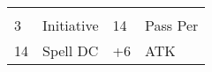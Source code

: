 \documentclass{article}
\begin{document}
\begin{adjustbox}{minipage=0.45\textwidth, margin=\fboxsep, bgimage=../images/texture2.pdf}
{\begin{minipage}[t][10.5in][t]{0.9\textwidth}
\begin{minipage}[t]{0.75\textwidth}
                \begin{tabularx}{1.\textwidth}{A B A B@{}} 
                    \\
                    3 & Initiative & 14 & Pass Per \\ \hline
                    14 & Spell DC & +6 & ATK \\ \hline
                \end{tabularx}
            \end{minipage}        
        \end{minipage}
	}
\end{adjustbox}
\end{document}
